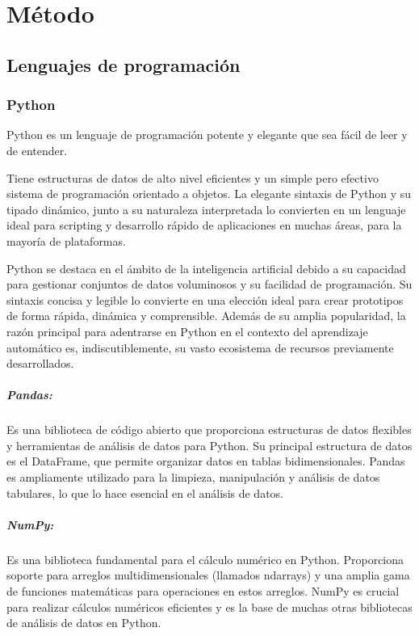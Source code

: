 \fancyhead{}
\fancyfoot{}
\cfoot{\thepage}



\chapter{Método}
\section{Lenguajes de programación}

\subsection{Python}
Python es un lenguaje de programación potente y elegante
que sea fácil de leer y de entender\cite{python2021python}.

Tiene estructuras de datos de alto nivel eficientes y un simple pero efectivo sistema de programación orientado a objetos. La elegante sintaxis de Python y su tipado dinámico, junto a su naturaleza interpretada lo convierten en un lenguaje ideal para scripting y desarrollo rápido de aplicaciones en muchas áreas, para la mayoría de plataformas.

Python se destaca en el ámbito de la inteligencia artificial debido a su capacidad para gestionar conjuntos de datos voluminosos y su facilidad de programación. Su sintaxis concisa y legible lo convierte en una elección ideal para crear prototipos de forma rápida, dinámica y comprensible.
Además de su amplia popularidad, la razón principal para adentrarse en Python en el contexto del aprendizaje automático es, indiscutiblemente, su vasto ecosistema de recursos previamente desarrollados. 

\paragraph{Pandas:}
Es una biblioteca de código abierto que proporciona estructuras de datos flexibles y herramientas de análisis de datos para Python. Su principal estructura de datos es el DataFrame, que permite organizar datos en tablas bidimensionales. Pandas es ampliamente utilizado para la limpieza, manipulación y análisis de datos tabulares, lo que lo hace esencial en el análisis de datos.

\paragraph{NumPy:}
Es una biblioteca fundamental para el cálculo numérico en Python. Proporciona soporte para arreglos multidimensionales (llamados ndarrays) y una amplia gama de funciones matemáticas para operaciones en estos arreglos. NumPy es crucial para realizar cálculos numéricos eficientes y es la base de muchas otras bibliotecas de análisis de datos en Python.

